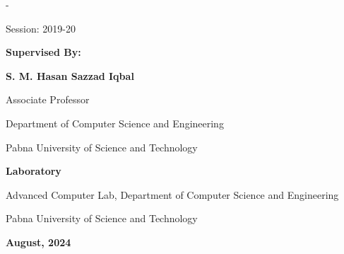 \begin{titlingpage}
\begin{SingleSpace}
\begin{adjustwidth*}{\unitlength}{-\unitlength}
\begin{center}
Session: 2019-20

\vspace{1cm}

{\textbf{Supervised By:}}

{\textbf{S. M. Hasan Sazzad Iqbal}}

Associate Professor

Department of Computer Science and Engineering

Pabna University of Science and Technology

\vspace{1cm}

\textbf{Laboratory}

Advanced Computer Lab, Department of Computer Science and Engineering

Pabna University of Science and Technology

\vspace{0.5 cm}

{\textbf{August, 2024 }}

\end{center}



\end{adjustwidth*}
\end{SingleSpace}
\end{titlingpage}